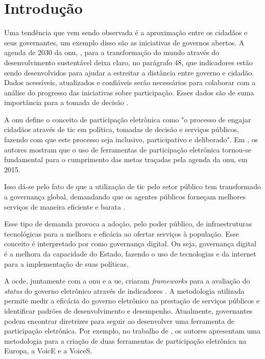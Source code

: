 \chapter[Introdução]{Introdução}
\label{cap:cap1}
Uma tendência que vem sendo observada é a aproximação entre os cidadãos e seus governantes, um exemplo disso são as iniciativas de governos abertos.
A agenda de 2030 da \acrfull{onu}, , para a transformação do mundo através do desenvolvimento sustentável deixa claro, no parágrafo 48, que
indicadores estão sendo desenvolvidos para ajudar a estreitar a distância entre governo e cidadão. Dados acessíveis, atualizados e confiáveis serão necessários para colaborar 
com a análise do progresso das iniciativas sobre participação. 
Esses dados são de suma importância para a tomada de decisão \cite{assembly2015transforming}.

\par
A \acrshort{onu} define o conceito de participação eletrônica como "o processo de engajar cidadãos através de \acrfull{tic} em política, tomadas de decisão e
serviços públicos, fazendo com que este processo seja inclusivo, participativo e deliberado". Em , os autores mostram que o uso de 
ferramentas de participação eletrônica tornou-se fundamental para o cumprimento das metas traçadas pela agenda da \acrshort{onu}, em 2015. 

\par
Isso dá-se pelo fato de que a utilização de \acrshort{tic} pelo setor público tem transformado a governança global, demandando que os agentes públicos forneçam melhores serviços 
de maneira eficiente e barata \cite{afdb2014uneca}. 

\par
Esse tipo de demanda provoca a adoção, pelo poder público, de infraestruturas tecnológicas para a melhora e eficácia ao ofertar serviços à população. Esse conceito é interpretado
por  como governança digital. Ou seja, governança digital é a melhora da capacidade do Estado, fazendo o uso de tecnologias e da internet 
para a implementação de suas políticas.

\par
A \acrfull{ocde}, juntamente com a \acrshort{onu} e a \acrfull{ue}, criaram \textit{frameworks} para a avaliação do \textit{status} do governo eletrônico através de indicadores \cite{onu2018}. A metodologia utilizada permite medir a eficácia do governo eletrônico na prestação de serviços públicos e identificar padrões de desenvolvimento e desempenho.
Atualmente, governantes podem encontrar diretrizes para seguir ao desenvolver uma ferramenta de participação eletrônica. 
Por exemplo,  no trabalho de , os autores apresentam uma metodologia para a criação de duas ferramentas de participação eletrônica na Europa, a VoicE e a VoiceS.

